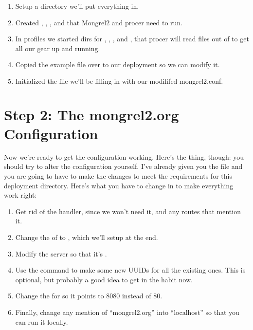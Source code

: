 \begin{enumerate}
  \item Setup a  directory we'll put everything in.
  \item Created , , , and  that Mongrel2 and procer need to run.
  \item In profiles we started dirs for , , ,  and ,
    that procer will read files out of to get all our gear up and running.
  \item Copied the  example file over to our deployment so we can modify it.
  \item Initialized the  file we'll be filling in with our modififed mongrel2.conf.
\end{enumerate}


\section{Step 2: The mongrel2.org Configuration}

Now we're ready to get the configuration working.  Here's the thing, though: you should
try to alter the configuration yourself.  I've already given you the file and you are
going to have to make the changes to meet the requirements for this deployment directory.
Here's what you have to change in  to make everything work right:

\begin{enumerate}
\item Get rid of the  handler, since we won't need it, and
    any routes that mention it.
\item Change the  of  to , which we'll setup at the end.
\item Modify the server  so that it's .
\item Use the  command to make some new UUIDs for all the
    existing ones.  This is optional, but probably a good idea to get in the
    habit now.
\item Change the  for  so it points to 8080 instead of 80.
\item Finally, change any mention of ``mongrel2.org'' into ``localhost'' so that you
    can run it locally.
\end{enumerate}

